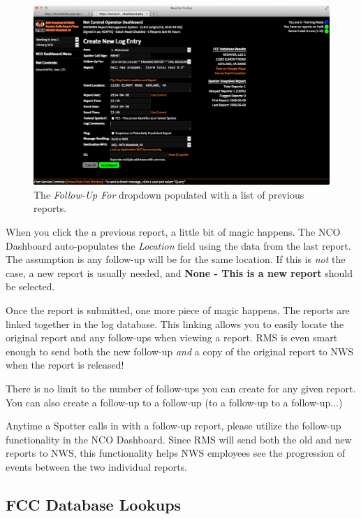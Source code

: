 \documentclass[pdflatex,letterpaper,twoside,12pt]{book}
\begin{document}
\begin{figure}[h]
  \centering
  \includegraphics[width=\textwidth,keepaspectratio=true]{img/dash-followup-create}
  \caption{The \emph{Follow-Up For} dropdown populated with a list of previous reports.\label{fig:dash-followup-create}}
\end{figure}

When you click the a previous report, a little bit of magic happens.  The NCO Dashboard auto-populates the \emph{Location} field using the data from the last report.  The assumption is any follow-up will be for the same location.  If this is \emph{not} the case, a new report is usually needed, and \textbf{None - This is a new report} should be selected.

Once the report is submitted, one more piece of magic happens.  The reports are linked together in the log database.  This linking allows you to easily locate the original report and any follow-ups when viewing a report.  RMS is even smart enough to send both the new follow-up \emph{and} a copy of the original report to NWS when the report is released!

There is no limit to the number of follow-ups you can create for any given report.  You can also create a follow-up to a follow-up (to a follow-up to a follow-up...)

Anytime a Spotter calls in with a follow-up report, please utilize the follow-up functionality in the NCO Dashboard.  Since RMS will send both the old and new reports to NWS, this functionality helps NWS employees see the progression of events between the two individual reports.

\subsection{FCC Database Lookups}
\end{document}
